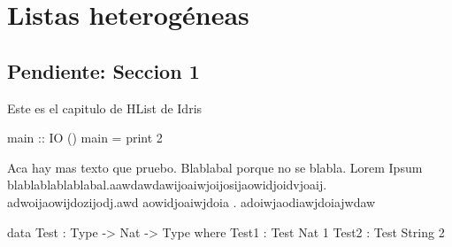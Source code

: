 

%

\chapter{Listas heterogéneas}
\label{ch:1}

\section{Pendiente: Seccion 1}
\begin{fullwidth}

Este es el capitulo de HList de Idris \cite{Kiselyov:2004:STH:1017472.1017488}
\end{fullwidth}

\begin{code}
main  ::  IO ()
main  =   print 2
\end{code}

Aca hay mas texto que pruebo. Blablabal porque no se blabla. Lorem Ipsum blablablablablabal.aawdawdawijoaiwjoijosijaowidjoidvjoaij. adwoijaowijdozijodj.awd aowidjoaiwjdoia . adoiwjaodiawjdoiajwdaw

\begin{code}
data Test : Type -> Nat -> Type where
    Test1 : Test Nat 1
    Test2 : Test String 2
\end{code}


%
